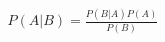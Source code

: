 \documentclass[preview]{standalone}
\begin{document}
\begin{align*}
P(A|B) = \frac{P(B|A) P(A)}{P(B)}
\end{align*}
\end{document}
